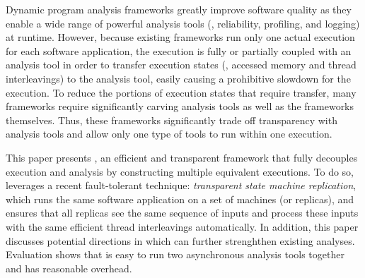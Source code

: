 
Dynamic program analysis frameworks greatly improve software quality as
they enable a wide range of powerful analysis tools (\eg, reliability,
profiling, and logging) at runtime. However, because existing frameworks run
only one actual execution for each software application, the execution is fully
or partially coupled with an analysis tool in order to transfer execution states
(\eg, accessed memory and thread interleavings) to the analysis tool, easily
causing a prohibitive slowdown for the execution. To reduce the portions of
execution states that require transfer, many frameworks require significantly
carving analysis tools as well as the frameworks themselves. Thus, these
frameworks significantly trade off transparency with analysis tools and allow
only one type of tools to run within one execution.


This paper presents \xxx, an efficient and transparent framework that fully 
decouples execution and analysis by constructing multiple equivalent 
executions. To do so, \xxx leverages a recent fault-tolerant technique: 
\emph{transparent state machine replication}, which runs the same 
software application on a set of machines (or replicas), and ensures that 
all replicas see the same sequence of inputs and process these inputs with 
the same efficient thread interleavings automatically. In addition, this paper 
discusses potential directions in which \xxx can further strenghthen existing 
analyses. Evaluation shows that \xxx is easy to run two asynchronous 
analysis tools together and has reasonable overhead.
